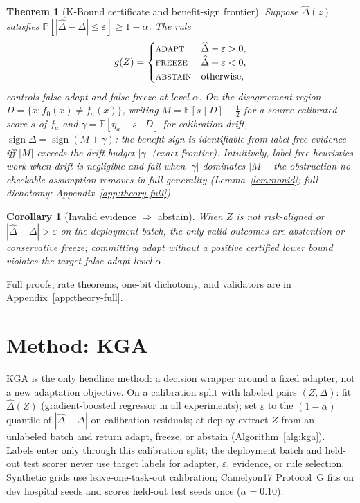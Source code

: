 \documentclass[conference]{IEEEtran}
\theoremstyle{plain}
\newtheorem{theorem}{Theorem}
\newtheorem{corollary}{Corollary}
\theoremstyle{definition}
\theoremstyle{remark}
\newcommand{\E}{\mathbb{E}}
\renewcommand{\Pr}{\mathbb{P}}
\newcommand{\sign}{\operatorname{sign}}
\begin{document}
\begin{theorem}[K-Bound certificate and benefit-sign frontier]\label{thm:headline}
Suppose $\widehat\Delta(z)$ satisfies $\Pr[|\widehat\Delta-\Delta|\le\varepsilon]\ge1-\alpha$.
The rule
\[
g(Z)=\begin{cases}
\textsc{adapt} & \widehat\Delta-\varepsilon>0,\\
\textsc{freeze} & \widehat\Delta+\varepsilon<0,\\
\textsc{abstain} & \text{otherwise},
\end{cases}
\]
controls false-adapt and false-freeze at level $\alpha$.
On the disagreement region $D=\{x:f_0(x)\neq f_a(x)\}$, writing
$M=\E[s\mid D]-\tfrac12$ for a source-calibrated score $s$ of $f_a$ and
$\gamma=\E[\eta_a-s\mid D]$ for calibration drift,
$\sign\Delta=\sign(M+\gamma)$: the benefit sign is identifiable from label-free
evidence iff $|M|$ exceeds the drift budget $|\gamma|$ (exact frontier).
Intuitively, label-free heuristics work when drift is negligible and fail when
$|\gamma|$ dominates $|M|$---the obstruction no checkable assumption removes in full
generality (Lemma~\ref{lem:nonid}; full dichotomy: Appendix~\ref{app:theory-full}).
\end{theorem}

\begin{corollary}[Invalid evidence $\Rightarrow$ abstain]\label{cor:abstain-valid}
When $Z$ is not risk-aligned or $|\widehat\Delta-\Delta|>\varepsilon$ on the deployment
batch, the only valid outcomes are abstention or conservative freeze; committing adapt
without a positive certified lower bound violates the target false-adapt level $\alpha$.
\end{corollary}

Full proofs, rate theorems, one-bit dichotomy, and validators are in
Appendix~\ref{app:theory-full}.

\section{Method: \textsc{KGA}}\label{sec:method}
\textsc{KGA} is the only headline method: a decision wrapper around a fixed adapter, not a new
adaptation objective. On a calibration split with labeled pairs $(Z,\Delta)$: fit
$\widehat\Delta(Z)$ (gradient-boosted regressor in all experiments); set
$\varepsilon$ to the $(1-\alpha)$ quantile of $|\widehat\Delta-\Delta|$ on calibration
residuals; at deploy extract $Z$ from an unlabeled batch and return adapt, freeze, or abstain
(Algorithm~\ref{alg:kga}). Labels enter only through this calibration split; the deployment
batch and held-out test scorer never use target labels for adapter, $\varepsilon$, evidence,
or rule selection. Synthetic grids use leave-one-task-out calibration; Camelyon17
Protocol~G fits on dev hospital seeds and scores held-out test seeds once ($\alpha{=}0.10$).
\end{document}
